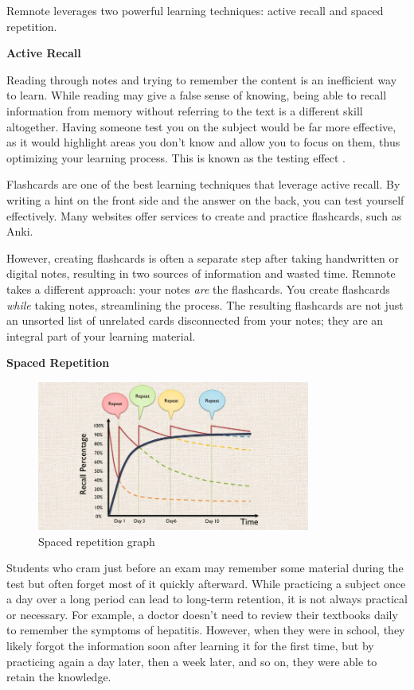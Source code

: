 \documentclass{article}
\begin{document}
Remnote leverages two powerful learning techniques:
active recall and spaced repetition.

\textbf{Active Recall}

Reading through notes and trying to remember the content
is an inefficient way to learn. While reading may give a
false sense of knowing, being able to recall information
from memory without referring to the text is a different
skill altogether. Having someone test you on the subject
would be far more effective, as it would highlight areas you
don't know and allow you to focus on them, thus optimizing
your learning process. This is known as the testing effect
\cite{wikipedia_testing_effect}.

Flashcards are one of the best learning techniques that leverage
active recall. By writing a hint on the front side
and the answer on the back, you can test yourself effectively.
Many websites offer services to create and practice flashcards,
such as Anki.

However, creating flashcards is often a separate step after
taking handwritten or digital notes, resulting in two sources
of information and wasted time. Remnote takes a different approach:
your notes \textit{are} the flashcards. You create flashcards
\textit{while} taking notes, streamlining the process.
The resulting flashcards are not just an unsorted list of
unrelated cards disconnected from your notes; they are an integral
part of your learning material.

\textbf{Spaced Repetition}

\begin{figure}[h]
    \centering
    \includegraphics[width=0.8\textwidth]{images/spaced_repetition_principle.png}
    \caption{Spaced repetition graph \cite{heylama_spaced_repetition}}
\end{figure}

Students who cram just before an exam may remember some material during
the test but often forget most of it quickly afterward.
While practicing a subject once a day over a long period can
lead to long-term retention, it is not always practical or necessary.
For example, a doctor doesn't need to review their textbooks daily to remember the symptoms of hepatitis.
However, when they were in school, they likely forgot the information
soon after learning it for the first time, but by practicing again
a day later, then a week later, and so on, they were able to retain
the knowledge.
\end{document}
